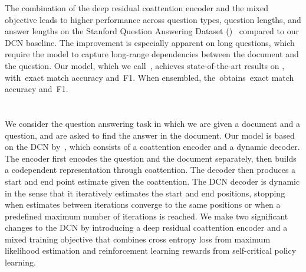 \documentclass{article} %
\begin{document}
The combination of the deep residual coattention encoder and the mixed objective leads to higher performance across question types, question lengths, and answer lengths on the Stanford Question Answering Dataset (\squad)~\citep{Rajpurkar2016SQuAD10} compared to our DCN baseline.
The improvement is especially apparent on long questions, which require the model to capture long-range dependencies between the document and the question.
Our model, which we call~\modelname, achieves state-of-the-art results on \squad, with~\emours exact match accuracy and~\fours F1.
When ensembled, the~\modelname obtains~\emoursensemble exact match accuracy and~\foursensemble F1.

 
 
 
 


 
\section{\modelname}
We consider the question answering task in which we are given a document and a question, and are asked to find the answer in the document.
Our model is based on the DCN by~\citet{xiong2016dynamic},
which consists of a coattention encoder and a dynamic decoder.
The encoder first encodes the question and the document separately, then builds a codependent representation through coattention.
The decoder then produces a start and end point estimate given the coattention.
The DCN decoder is dynamic in the sense that it iteratively estimates the start and end positions, stopping when estimates between iterations converge to the same positions or when a predefined maximum number of iterations is reached.
We make two significant changes to the DCN by introducing a deep residual coattention encoder and a mixed training objective that combines cross entropy loss from maximum likelihood estimation and reinforcement learning rewards from self-critical policy learning.

\end{document}
